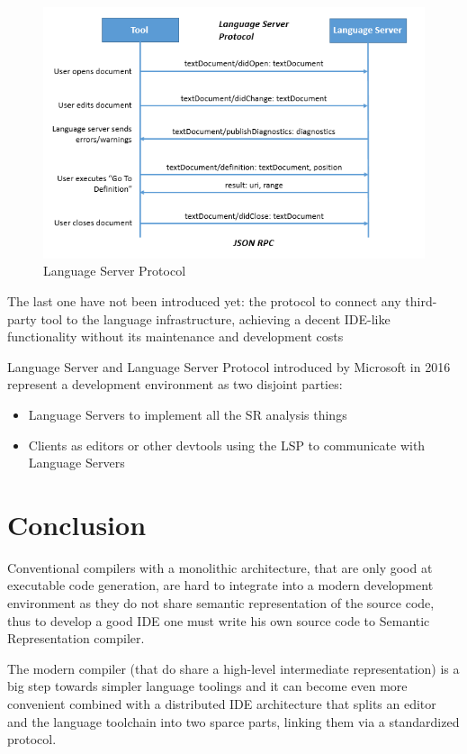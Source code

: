 \newpage

\begin{figure}[H]
    \centering
    \includegraphics[width=1.0\textwidth]{figs/lsp.png}
    \caption{Language Server Protocol}
\end{figure}

The last one have not been introduced yet: the protocol to connect any
third-party tool to the language infrastructure, achieving a decent IDE-like
functionality without its maintenance and development costs
   
Language Server and Language Server Protocol introduced by Microsoft in 2016
represent a development environment as two disjoint parties:
\begin{itemize}
    \item Language Servers to implement all the SR analysis things
    \item Clients as editors or other devtools using the LSP to communicate with Language Servers \cite{Sourcegraph}
\end{itemize}

\newpage
\section{Conclusion}
\label{sec:review_conclusion}

Conventional compilers with a monolithic architecture, that are only good at executable code generation,
are hard to integrate into a modern development environment as they do not share 
semantic representation of the source code, thus to develop a good IDE one must write his own 
source code to Semantic Representation compiler.

The modern compiler (that do share a high-level intermediate representation) is
a big step towards simpler language toolings and it can become even more convenient
combined with a distributed IDE architecture that splits an editor and the language toolchain
into two sparce parts, linking them via a standardized protocol.

